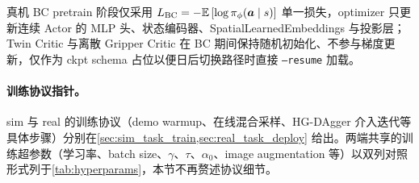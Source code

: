 真机 BC pretrain 阶段仅采用 $L_\text{BC} = -\mathbb{E}\left[\log \pi_\phi(\bm{a}\mid s)\right]$ 单一损失，optimizer 只更新连续 Actor 的 MLP 头、状态编码器、SpatialLearnedEmbeddings 与投影层；Twin Critic 与离散 Gripper Critic 在 BC 期间保持随机初始化、不参与梯度更新，仅作为 ckpt schema 占位以便日后切换路径时直接 \texttt{--resume} 加载。

\paragraph{训练协议指针。}sim 与 real 的训练协议（demo warmup、在线混合采样、HG-DAgger 介入迭代等具体步骤）分别在\cref{sec:sim_task_train,sec:real_task_deploy} 给出。两端共享的训练超参数（学习率、batch size、$\gamma$、$\tau$、$\alpha_0$、image augmentation 等）以双列对照形式列于\cref{tab:hyperparams}，本节不再赘述协议细节。

